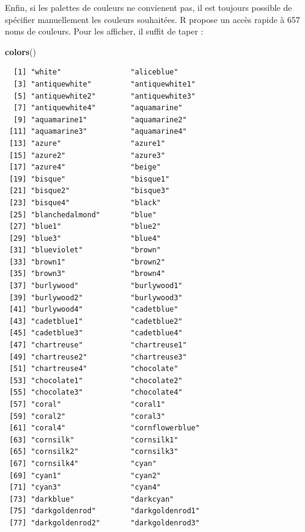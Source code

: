 \documentclass[
  a4paper,
]{article}
\newenvironment{Shaded}{\begin{snugshade}}{\end{snugshade}}
\newcommand{\KeywordTok}[1]{\textcolor[rgb]{0.12,0.11,0.11}{\textbf{#1}}}
\newcommand{\NormalTok}[1]{\textcolor[rgb]{0.12,0.11,0.11}{#1}}
\begin{document}
Enfin, si les palettes de couleurs ne convienent pas, il est toujours possible de spécifier manuellement les couleurs souhaitées. R propose un accès rapide à 657 noms de couleurs. Pour les afficher, il suffit de taper :

\begin{Shaded}
\begin{Highlighting}[]
\KeywordTok{colors}\NormalTok{()}
\end{Highlighting}
\end{Shaded}

\begin{verbatim}
  [1] "white"                "aliceblue"           
  [3] "antiquewhite"         "antiquewhite1"       
  [5] "antiquewhite2"        "antiquewhite3"       
  [7] "antiquewhite4"        "aquamarine"          
  [9] "aquamarine1"          "aquamarine2"         
 [11] "aquamarine3"          "aquamarine4"         
 [13] "azure"                "azure1"              
 [15] "azure2"               "azure3"              
 [17] "azure4"               "beige"               
 [19] "bisque"               "bisque1"             
 [21] "bisque2"              "bisque3"             
 [23] "bisque4"              "black"               
 [25] "blanchedalmond"       "blue"                
 [27] "blue1"                "blue2"               
 [29] "blue3"                "blue4"               
 [31] "blueviolet"           "brown"               
 [33] "brown1"               "brown2"              
 [35] "brown3"               "brown4"              
 [37] "burlywood"            "burlywood1"          
 [39] "burlywood2"           "burlywood3"          
 [41] "burlywood4"           "cadetblue"           
 [43] "cadetblue1"           "cadetblue2"          
 [45] "cadetblue3"           "cadetblue4"          
 [47] "chartreuse"           "chartreuse1"         
 [49] "chartreuse2"          "chartreuse3"         
 [51] "chartreuse4"          "chocolate"           
 [53] "chocolate1"           "chocolate2"          
 [55] "chocolate3"           "chocolate4"          
 [57] "coral"                "coral1"              
 [59] "coral2"               "coral3"              
 [61] "coral4"               "cornflowerblue"      
 [63] "cornsilk"             "cornsilk1"           
 [65] "cornsilk2"            "cornsilk3"           
 [67] "cornsilk4"            "cyan"                
 [69] "cyan1"                "cyan2"               
 [71] "cyan3"                "cyan4"               
 [73] "darkblue"             "darkcyan"            
 [75] "darkgoldenrod"        "darkgoldenrod1"      
 [77] "darkgoldenrod2"       "darkgoldenrod3"      

\end{verbatim}
\end{document}
